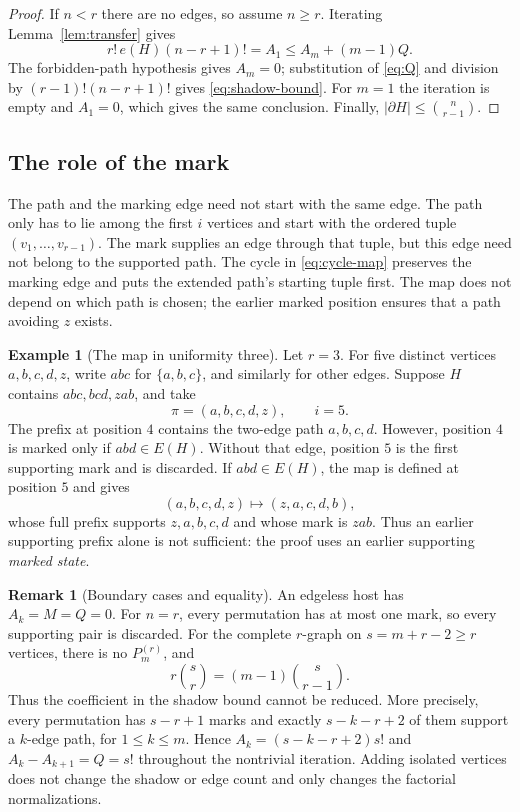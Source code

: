 \documentclass[11pt]{article}
\numberwithin{equation}{section}
\theoremstyle{definition}
\newtheorem{remark}[theorem]{Remark}
\newtheorem{example}[theorem]{Example}
\begin{document}
\begin{proof}
If $n<r$ there are no edges, so assume $n\geq r$.
Iterating Lemma~\ref{lem:transfer} gives
\[
 r!\,e(H)(n-r+1)!=A_1\leq A_m+(m-1)Q.
\]
The forbidden-path hypothesis gives $A_m=0$; substitution of
\eqref{eq:Q} and division by $(r-1)!(n-r+1)!$ gives
\eqref{eq:shadow-bound}.  For $m=1$ the iteration is empty and
$A_1=0$, which gives the same conclusion.  Finally,
$|\partial H|\leq\binom n{r-1}$.
\end{proof}

\subsection{The role of the mark}

The path and the marking edge need not start with the same edge.
The path only has to lie among the first $i$ vertices and start with
the ordered tuple $(v_1,\ldots,v_{r-1})$.  The mark supplies an edge
through that tuple, but this edge need not belong to the supported path.
The cycle in \eqref{eq:cycle-map} preserves the marking edge and puts
the extended path's starting tuple first.  The map does not depend on
which path is chosen; the earlier marked position ensures that a path
avoiding $z$ exists.

\begin{example}[The map in uniformity three]
Let $r=3$.  For five distinct vertices $a,b,c,d,z$, write $abc$ for
$\{a,b,c\}$, and similarly for other edges.  Suppose $H$ contains
$abc,bcd,zab$, and take
\[
 \pi=(a,b,c,d,z),\qquad i=5.
\]
The prefix at position $4$ contains the two-edge path $a,b,c,d$.
However, position $4$ is marked only if $abd\in E(H)$.  Without that
edge, position $5$ is the first supporting mark and is discarded.
If $abd\in E(H)$, the map is defined at position $5$ and gives
\[
 (a,b,c,d,z)\longmapsto(z,a,c,d,b),
\]
whose full prefix supports $z,a,b,c,d$ and whose mark is $zab$.
Thus an earlier supporting prefix alone is not sufficient: the proof
uses an earlier supporting \emph{marked state}.
\end{example}

\begin{remark}[Boundary cases and equality]
An edgeless host has $A_k=M=Q=0$.  For $n=r$, every permutation has at
most one mark, so every supporting pair is discarded.
For the complete $r$-graph on $s=m+r-2\geq r$ vertices, there is no
$P_m^{(r)}$, and
\[
 r\binom{s}{r}=(m-1)\binom{s}{r-1}.
\]
Thus the coefficient in the shadow bound cannot be reduced.  More
precisely, every permutation has $s-r+1$ marks and exactly $s-k-r+2$
of them support a $k$-edge path, for $1\leq k\leq m$.  Hence
$A_k=(s-k-r+2)s!$ and $A_k-A_{k+1}=Q=s!$ throughout the nontrivial
iteration.  Adding isolated vertices does not change the shadow or edge
count and only changes the factorial normalizations.
\end{remark}
\end{document}
